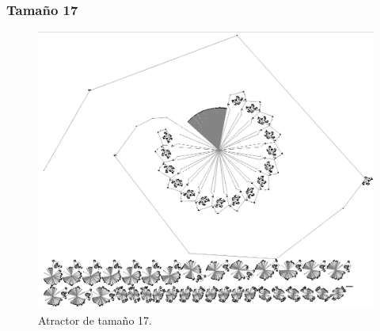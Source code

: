 \documentclass[11pt]{article}
\begin{document}
			\subsubsection{Tamaño 17}
			\begin{figure}[H]
			\centering
			\includegraphics[scale=0.7]{resources/Atractores22/atractor_22_size_17.png}
			\caption{Atractor de tamaño 17.}\label{fig:picture}
			\end{figure}
\end{document}
